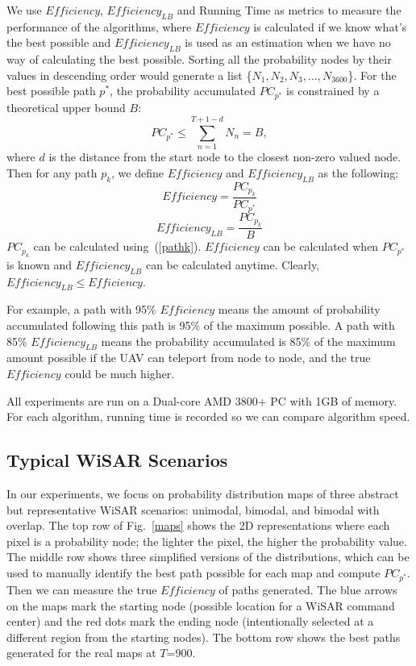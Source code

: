 \documentclass[letterpaper, 10 pt, conference]{ieeeconf}
\begin{document}
We use $\mathit{Efficiency}$, $\mathit{Efficiency_{LB}}$ and Running Time as metrics to measure the performance of the algorithms, where $\mathit{Efficiency}$ is calculated if we know what's the best possible and $\mathit{Efficiency_{LB}}$ is used as an estimation when we have no way of calculating the best possible. Sorting all the probability nodes by their values in descending order would generate a list \{$N_1, N_2, N_3, ..., N_{3600}$\}. For the best possible path $p^*$, the probability accumulated $PC_{p^*}$ is constrained by a theoretical upper bound $B$:
\begin{equation}
PC_{p^*} \leq \sum_{n=1}^{T+1-d}N_n = B,
\label{topN}
\end{equation}
where $d$ is the distance from the start node to the closest non-zero valued node. Then for any path $p_k$, we define $\mathit{Efficiency}$ and $\mathit{Efficiency_{LB}}$ as the following:
\begin{equation}
\mathit{Efficiency} = \frac{PC_{p_k}}{PC_{p^*}}
\label{Efficiency}
\end{equation}
\begin{equation}
\mathit{Efficiency_{LB}} = \frac{PC_{p_k}}{B}
\label{EfficiencyLB}
\end{equation}
$PC_{p_k}$ can be calculated using~(\ref{pathk}). $\mathit{Efficiency}$ can be calculated when $PC_{p^*}$ is known and $\mathit{Efficiency_{LB}}$ can be calculated anytime. Clearly, $\mathit{Efficiency_{LB}} \leq \mathit{Efficiency}$.

For example, a path with 95\% $\mathit{Efficiency}$ means the amount of probability accumulated following this path is 95\% of the maximum possible. A path with 85\% $\mathit{Efficiency_{LB}}$ means the probability accumulated is 85\% of the maximum amount possible if the UAV can teleport from node to node, and the true $\mathit{Efficiency}$ could be much higher.

All experiments are run on a Dual-core AMD 3800+ PC with 1GB of memory. For each algorithm, running time is recorded so we can compare algorithm speed.


\subsection{Typical WiSAR Scenarios}

In our experiments, we focus on probability distribution maps of three abstract but representative WiSAR scenarios: unimodal, bimodal, and bimodal with overlap. The top row of Fig.~\ref{maps} shows the 2D representations where each pixel is a probability node; the lighter the pixel, the higher the probability value. The middle row shows three simplified versions of the distributions, which can be used to manually identify the best path possible for each map and compute $PC_{p^*}$. Then we can measure the true $\mathit{Efficiency}$ of paths generated. The blue arrows on the maps mark the starting node (possible location for a WiSAR command center) and the red dots mark the ending node (intentionally selected at a different region from the starting nodes). The bottom row shows the best paths generated for the real maps at $T$=900.
\end{document}
